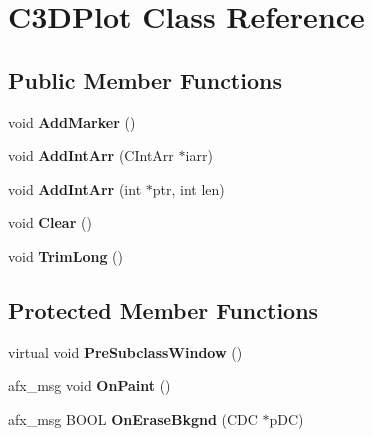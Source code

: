 \hypertarget{class_c3_d_plot}{\section{C3\-D\-Plot Class Reference}
\label{class_c3_d_plot}
}
\subsection*{Public Member Functions}
\begin{DoxyCompactItemize}
\item 
\hypertarget{class_c3_d_plot_a371e0ea04ce4b1c9afb7f89417268c6f}{void {\bfseries Add\-Marker} ()}\label{class_c3_d_plot_a371e0ea04ce4b1c9afb7f89417268c6f}

\item 
\hypertarget{class_c3_d_plot_a28598a9b82230c93ec9bc1320027464c}{void {\bfseries Add\-Int\-Arr} (C\-Int\-Arr $\ast$iarr)}\label{class_c3_d_plot_a28598a9b82230c93ec9bc1320027464c}

\item 
\hypertarget{class_c3_d_plot_a09e1581c96ccdec48443e4ca655455b3}{void {\bfseries Add\-Int\-Arr} (int $\ast$ptr, int len)}\label{class_c3_d_plot_a09e1581c96ccdec48443e4ca655455b3}

\item 
\hypertarget{class_c3_d_plot_ab2232ecbb47919a0fb62555849af8d57}{void {\bfseries Clear} ()}\label{class_c3_d_plot_ab2232ecbb47919a0fb62555849af8d57}

\item 
\hypertarget{class_c3_d_plot_aa8aa82364d32446566189d30c2bb17fe}{void {\bfseries Trim\-Long} ()}\label{class_c3_d_plot_aa8aa82364d32446566189d30c2bb17fe}

\end{DoxyCompactItemize}
\subsection*{Protected Member Functions}
\begin{DoxyCompactItemize}
\item 
\hypertarget{class_c3_d_plot_a53fadad8e2770647ab7cf3f40c04623e}{virtual void {\bfseries Pre\-Subclass\-Window} ()}\label{class_c3_d_plot_a53fadad8e2770647ab7cf3f40c04623e}

\item 
\hypertarget{class_c3_d_plot_a5c63d54f5a90fd06acc7926ff1e9e9a9}{afx\-\_\-msg void {\bfseries On\-Paint} ()}\label{class_c3_d_plot_a5c63d54f5a90fd06acc7926ff1e9e9a9}

\item 
\hypertarget{class_c3_d_plot_a7a19a2209ba6d2052403940d8ea068ea}{afx\-\_\-msg B\-O\-O\-L {\bfseries On\-Erase\-Bkgnd} (C\-D\-C $\ast$p\-D\-C)}\label{class_c3_d_plot_a7a19a2209ba6d2052403940d8ea068ea}

\end{DoxyCompactItemize}
